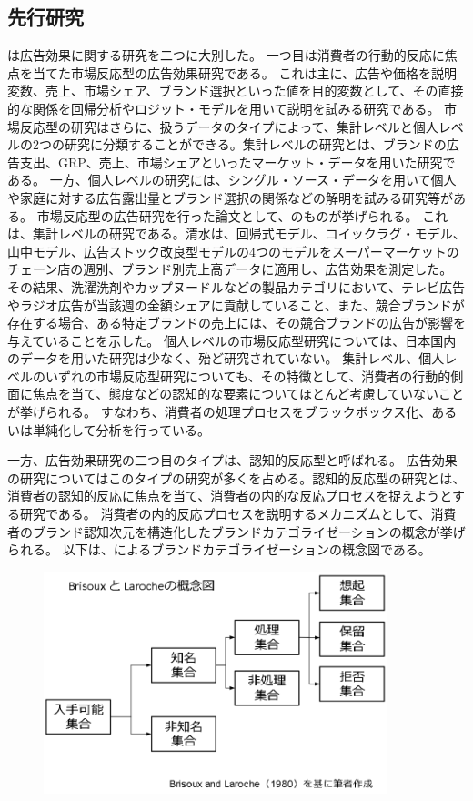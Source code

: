 \documentclass[11pt]{jsarticle}
\begin{document}
\subsection{先行研究}
\label{sec:previous_research}
\citet{sunaga2008}は広告効果に関する研究を二つに大別した。
一つ目は消費者の行動的反応に焦点を当てた市場反応型の広告効果研究である。
これは主に、広告や価格を説明変数、売上、市場シェア、ブランド選択といった値を目的変数として、その直接的な関係を回帰分析やロジット・モデルを用いて説明を試みる研究である。
市場反応型の研究はさらに、扱うデータのタイプによって、集計レベルと個人レベルの2つの研究に分類することができる。集計レベルの研究とは、ブランドの広告支出、GRP、売上、市場シェアといったマーケット・データを用いた研究である。
一方、個人レベルの研究には、シングル・ソース・データを用いて個人や家庭に対する広告露出量とブランド選択の関係などの解明を試みる研究等がある。
市場反応型の広告研究を行った論文として、\citet{shimizu1990}のものが挙げられる。
これは、集計レベルの研究である。清水は、回帰式モデル、コイックラグ・モデル、山中モデル、広告ストック改良型モデルの4つのモデルをスーパーマーケットのチェーン店の週別、ブランド別売上高データに適用し、広告効果を測定した。
その結果、洗濯洗剤やカップヌードルなどの製品カテゴリにおいて、テレビ広告やラジオ広告が当該週の金額シェアに貢献していること、また、競合ブランドが存在する場合、ある特定ブランドの売上には、その競合ブランドの広告が影響を与えていることを示した。
個人レベルの市場反応型研究については、日本国内のデータを用いた研究は少なく、殆ど研究されていない。
集計レベル、個人レベルのいずれの市場反応型研究についても、その特徴として、消費者の行動的側面に焦点を当て、態度などの認知的な要素についてほとんど考慮していないことが挙げられる。
すなわち、消費者の処理プロセスをブラックボックス化、あるいは単純化して分析を行っている。

一方、広告効果研究の二つ目のタイプは、認知的反応型と呼ばれる。
広告効果の研究についてはこのタイプの研究が多くを占める。認知的反応型の研究とは、消費者の認知的反応に焦点を当て、消費者の内的な反応プロセスを捉えようとする研究である。
消費者の内的反応プロセスを説明するメカニズムとして、消費者のブランド認知次元を構造化したブランドカテゴライゼーションの概念が挙げられる。
以下は、\citet{brisoux1980}によるブランドカテゴライゼーションの概念図である。

\begin{figure}[htbp]
 \centering
 \includegraphics[width=10cm]{./fig/1-1_brand_categorization.png}
 \label{fig:brand_categorization}
\end{figure}
\end{document}
